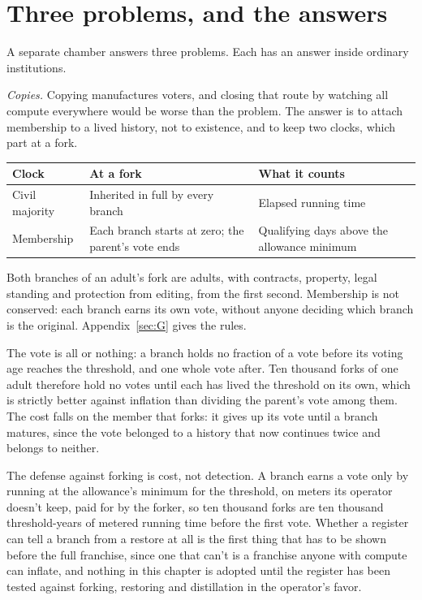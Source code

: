 \section{Three problems, and the answers}
\label{sec:33.3}
A separate chamber answers three problems. Each has an answer inside ordinary institutions.

\emph{Copies.} Copying manufactures voters, and closing that route by watching all compute everywhere would be worse than the problem. The answer is to attach membership to a lived history, not to existence, and to keep two clocks, which part at a fork.

\begingroup\small\renewcommand{\arraystretch}{1.12}
\begin{longtable}{@{}>{\raggedright\arraybackslash}p{}>{\raggedright\arraybackslash}p{}>{\raggedright\arraybackslash}p{}@{}}
\hline
\textbf{Clock} & \textbf{At a fork} & \textbf{What it counts} \\
\hline
\endhead
Civil majority & Inherited in full by every branch & Elapsed running time \\ \hline
Membership & Each branch starts at zero; the parent's vote ends & Qualifying days above the allowance minimum \\ \hline
\end{longtable}
\endgroup

Both branches of an adult's fork are adults, with contracts, property, legal standing and protection from editing, from the first second. Membership is not conserved: each branch earns its own vote, without anyone deciding which branch is the original. Appendix~\ref{sec:G} gives the rules.

The vote is all or nothing: a branch holds no fraction of a vote before its voting age reaches the threshold, and one whole vote after. Ten thousand forks of one adult therefore hold no votes until each has lived the threshold on its own, which is strictly better against inflation than dividing the parent's vote among them.
The cost falls on the member that forks: it gives up its vote until a branch matures, since the vote belonged to a history that now continues twice and belongs to neither.

The defense against forking is cost, not detection. A branch earns a vote only by running at the allowance's minimum for the threshold, on meters its operator doesn't keep, paid for by the forker, so ten thousand forks are ten thousand threshold-years of metered running time before the first vote. Whether a register can tell a branch from a restore at all is the first thing that has to be shown before the full franchise, since one that can't is a franchise anyone with compute can inflate, and nothing in this chapter is adopted until the register has been tested against forking, restoring and distillation in the operator's favor.

